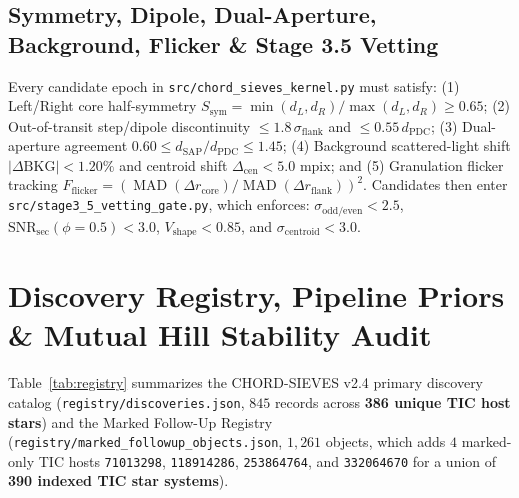 \documentclass[10pt,twocolumn]{article}
\begin{document}
\subsection{Symmetry, Dipole, Dual-Aperture, Background, Flicker \& Stage 3.5 Vetting}
Every candidate epoch in \texttt{src/chord\_sieves\_kernel.py} must satisfy: (1) Left/Right core half-symmetry $S_{\text{sym}} = \min(d_L, d_R)/\max(d_L, d_R) \ge 0.65$; (2) Out-of-transit step/dipole discontinuity $\le 1.8\,\sigma_{\text{flank}}$ and $\le 0.55\,d_{\text{PDC}}$; (3) Dual-aperture agreement $0.60 \le d_{\text{SAP}}/d_{\text{PDC}} \le 1.45$; (4) Background scattered-light shift $\lvert \Delta\text{BKG} \rvert < 1.20\%$ and centroid shift $\Delta_{\text{cen}} < 5.0\text{ mpix}$; and (5) Granulation flicker tracking $F_{\text{flicker}} = (\operatorname{MAD}(\Delta r_{\text{core}})/\operatorname{MAD}(\Delta r_{\text{flank}}))^2$. Candidates then enter \texttt{src/stage3\_5\_vetting\_gate.py}, which enforces: $\sigma_{\text{odd/even}} < 2.5$, $\text{SNR}_{\text{sec}}(\phi=0.5) < 3.0$, $V_{\text{shape}} < 0.85$, and $\sigma_{\text{centroid}} < 3.0$.

\section{Discovery Registry, Pipeline Priors \& Mutual Hill Stability Audit}
Table~\ref{tab:registry} summarizes the CHORD-SIEVES v2.4 primary discovery catalog (\texttt{registry/discoveries.json}, $845$ records across \textbf{386 unique TIC host stars}) and the Marked Follow-Up Registry (\texttt{registry/marked\_followup\_objects.json}, $1{,}261$ objects, which adds $4$ marked-only TIC hosts \texttt{71013298}, \texttt{118914286}, \texttt{253864764}, and \texttt{332064670} for a union of \textbf{390 indexed TIC star systems}).
\end{document}
